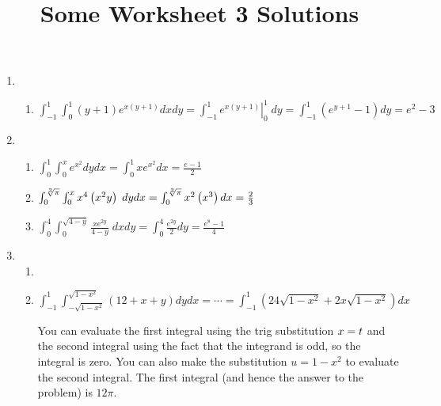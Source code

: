 \documentclass[12pt]{article}
\title{Some Worksheet 3 Solutions}
\author{}\date{}
\let\sin\relax\DeclareMathOperator{\sin}{\mathsf{sin}}
\let\cos\relax\DeclareMathOperator{\cos}{\mathsf{cos}}
\begin{document}
\maketitle
\thispagestyle{empty}

\begin{enumerate}
\item
\begin{enumerate}
\item $\int_{-1}^1\int_0^1\left(y+1\right)e^{x\left(y+1\right)}dxdy
=\int_{-1}^1\left.e^{x\left(y+1\right)}\right|_0^1\;dy
=\int_{-1}^1\left(e^{y+1}-1\right)dy=e^2-3$
\end{enumerate}
\item
\begin{enumerate}
\item $\int_0^1\int_0^xe^{x^2}dydx
=\int_0^1xe^{x^2}dx=\frac{e-1}{2}$
\item $\int_0^{\sqrt[3]{\pi}}\int_0^xx^4\cos\left(x^2y\right)\;dydx
=\int_0^{\sqrt[3]{\pi}}x^2\cos\left(x^3\right)dx=\frac{2}{3}$
\item $\int_0^4\int_0^{\sqrt{4-y}}\frac{xe^{2y}}{4-y}\;dxdy
=\int_0^4\frac{e^{2y}}{2}dy=\frac{e^8-1}{4}$
\end{enumerate}
\item
\begin{enumerate}
\item
\item $\int_{-1}^1\int_{-\sqrt{1-x^2}}^{\sqrt{1-x^2}}
\left(12+x+y\right)dydx
=\cdots
=\int_{-1}^1\left(24\sqrt{1-x^2}+2x\sqrt{1-x^2}\right)dx$

You can evaluate the first integral using the trig substitution $x=\sin{t}$
and the second integral using the fact
that the integrand is odd, so the integral is zero.
You can also make the substitution $u=1-x^2$ to evaluate the second integral.
The first integral (and hence the answer to the problem) is $12\pi$.
\end{enumerate}
\end{enumerate}
\end{document}
